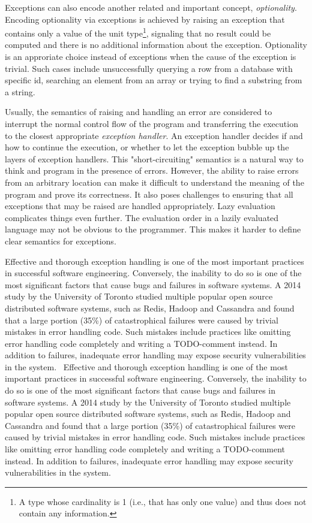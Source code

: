 Exceptions can also encode another related and important concept, \textit{optionality}. Encoding optionality via exceptions is achieved by raising an exception that contains only a value of the unit type\footnote{A type whose cardinality is 1 (i.e., that has only one value) and thus does not contain any information.}, signaling that no result could be computed and there is no additional information about the exception. Optionality is an approriate choice instead of exceptions when the cause of the exception is trivial. Such cases include unsuccessfully querying a row from a database with specific id, searching an element from an array or trying to find a substring from a string.

Usually, the semantics of raising and handling an error are considered to interrupt the normal control flow of the program and transferring the execution to the closest appropriate \textit{exception handler}. An exception handler decides if and how to continue the execution, or whether to let the exception bubble up the layers of exception handlers. This "short-circuiting" semantics is a natural way to think and program in the presence of errors. However, the ability to raise errors from an arbitrary location can make it difficult to understand the meaning of the program and prove its correctness. It also poses challenges to ensuring that all exceptions that may be raised are handled appropriately. Lazy evaluation complicates things even further. The evaluation order in a lazily evaluated language may not be obvious to the programmer. This makes it harder to define clear semantics for exceptions.~\cite{imprecise-exceptions}

Effective and thorough exception handling is one of the most important practices in successful software engineering. Conversely, the inability to do so is one of the most significant factors that cause bugs and failures in software systems. A 2014 study by the University of Toronto studied multiple popular open source distributed software systems, such as Redis, Hadoop and Cassandra and found that a large portion (35\%) of catastrophical failures were caused by trivial mistakes in error handling code. Such mistakes include practices like omitting error handling code completely and writing a TODO-comment instead. In addition to failures, inadequate error handling may expose security vulnerabilities in the system.~\cite{simple-testing-failures}
Effective and thorough exception handling is one of the most important practices in successful software engineering. Conversely, the inability to do so is one of the most significant factors that cause bugs and failures in software systems. A 2014 study by the University of Toronto studied multiple popular open source distributed software systems, such as Redis, Hadoop and Cassandra and found that a large portion (35\%) of catastrophical failures were caused by trivial mistakes in error handling code. Such mistakes include practices like omitting error handling code completely and writing a TODO-comment instead. In addition to failures, inadequate error handling may expose security vulnerabilities in the system.~\cite{simple-testing-failures}


